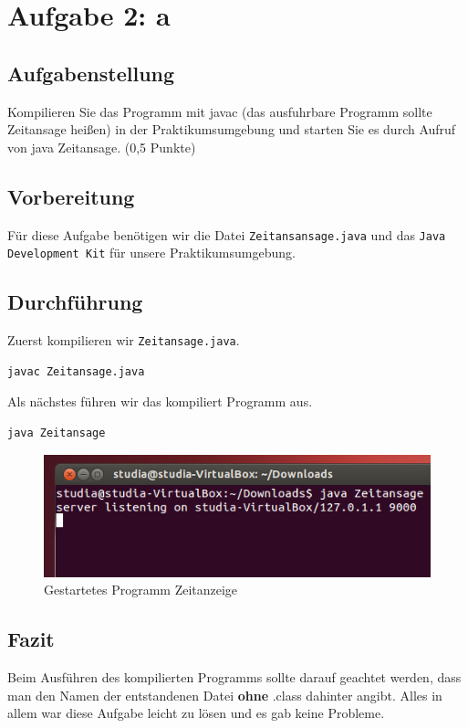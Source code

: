 \newpage
\section{Aufgabe 2: a}

\subsection{Aufgabenstellung}
Kompilieren Sie das Programm mit javac (das ausfuhrbare Programm sollte Zeitansage
heißen) in der Praktikumsumgebung und starten Sie es durch Aufruf von java Zeitansage.
(0,5 Punkte)

\subsection{Vorbereitung}
Für diese Aufgabe benötigen wir die Datei \texttt{Zeitansansage.java} und das \texttt{Java Development Kit} für unsere Praktikumsumgebung.

\subsection{Durchführung}
Zuerst kompilieren wir \texttt{Zeitansage.java}.

\begin{lstlisting}
javac Zeitansage.java
\end{lstlisting}
Als nächstes führen wir das kompiliert Programm aus.

\begin{lstlisting}
java Zeitansage
\end{lstlisting}

\begin{figure}[H]
	\centering
	\includegraphics[width=0.4 \linewidth]{images/18}
	\caption{Gestartetes Programm Zeitanzeige}
\end{figure}

\subsection{Fazit}
Beim Ausführen des kompilierten Programms sollte darauf geachtet werden, dass man den Namen der entstandenen Datei \textbf{ohne} .class dahinter angibt. Alles in allem war diese Aufgabe leicht zu lösen und es gab keine Probleme.

